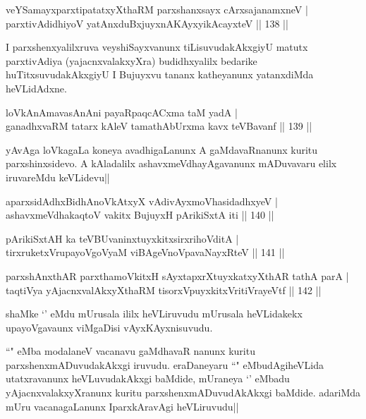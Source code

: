 
\begin{shl}
veYSamayxparxtipatatxyXthaRM parxshanxsayx cArxsajanamxneV |\\
parxtivAdidhiyoV yatAnxduBxjuyxnA\s \s KAyxyikAcayxteV \hfill || 138 ||
\end{shl}

\begin{artha}
I parxshenxyalilxruva veyshiSayxvanunx tiLisuvudakAkxgiyU matutx parxtivAdiya (yajacnxvalakxyXra) budidhxyalilx bedarike huTitxsuvudakAkxgiyU I Bujuyxvu tananx katheyanunx yatanxdiMda heVLidAdxne.
\end{artha}

\begin{shl}
loVkAnAmavasAnAni payaRpaqcACxma taM yadA |\\
ganadhxvaRM tatarx kAleV tamathAbUrxma kavx teV\s Bavanf \hfill || 139 ||
\end{shl}

\begin{artha}
yAvAga loVkagaLa koneya avadhigaLanunx A gaMdavaRnanunx kuritu parxshinxsidevo. A kAladalilx ashavxmeVdhayAgavanunx mADuvavaru elilx iruvareMdu keVLidevu||
\end{artha}

\begin{shl}
aparxsidAdhxBidhAnoVkAtxyX vAdivAyxmoVhasidadhxyeV |\\
ashavxmeVdhakaqtoV vakitx BujuyxH pArikiSxtA iti \hfill || 140 ||
\end{shl}

\begin{shl}
pArikiSxtAH ka teV\s BUvaninxtuyxkitxsirxrihoVditA |\\
tirxruketxVrupayoVgoV\s yaM viBAgeVnoVpavaNayxRteV \hfill || 141 ||
\end{shl}

\begin{shl}
parxshAnxthAR parxthamoVkitxH sAyxtapxrXtuyxkatxyXthAR tathA parA |\\
taqtiVya yAjacnxvalAkxyXthaRM tisorxV\s puyxkitxVritiVrayeVtf \hfill || 142 ||
\end{shl}

\begin{artha}
shaMke `\stext' eMdu mUrusala ililx heVLiruvudu mUrusala heVLidakekx upayoVgavaunx viMgaDisi vAyxKAyxnisuvudu.
\end{artha}

\begin{artha}
``\stext" eMba modalaneV vacanavu gaMdhavaR nanunx kuritu parxshenxmADuvudakAkxgi iruvudu. eraDaneyaru ``\stext" eMbudAgiheVLida utatxravanunx heVLuvudakAkxgi baMdide, mUraneya `\stext' eMbadu yAjacnxvalakxyXranunx kuritu parxshenxmADuvudAkAkxgi baMdide. adariMda mUru vacanagaLanunx IparxkAravAgi heVLiruvudu||
\end{artha}

